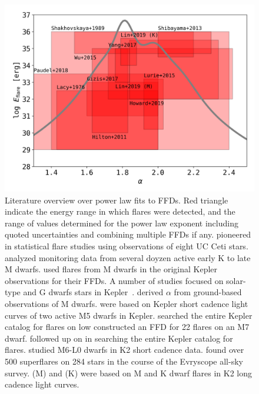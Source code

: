 \documentclass{aa}
\begin{document}
\begin{appendix}
   \begin{figure}
   \centering
            \includegraphics[width=\hsize]{pics/appendix/overview_alpha_literature.png}
         \caption{Literature overview over power law fits to FFDs. Red triangle indicate the energy range in which flares were detected, and the range of values determined for the power law exponent including quoted uncertainties and combining multiple FFDs if any. \citet{lacy_uv_1976} pioneered in statistical flare studies using observations of eight UC Ceti stars. \citet{shakhovskaya_stellar_1989} analyzed monitoring data from several doyzen active early K to late M dwarfs. \citet{hawley_kepler_2014} used flares from M dwarfs in the original Kepler observations for their FFDs. A number of studies focused on solar-type and G dwarfs stars in Kepler~\citep{maehara_superflares_2012,wu2015,shibayama_2013}. \citet{hilton2011} derived $\alpha$ from ground-based observations of M dwarfs. \citet{lurie_kepler_2015} were based on Kepler short cadence light curves of two active M5 dwarfs in Kepler. \citet{davenport_kepler_2016} searched the entire Kepler catalog for flares on low\citet{gizis_k2_2017-1} constructed an FFD for 22 flares on an M7 dwarf. \citet{yang_flaring_2017} followed up on \citet{davenport_kepler_2016} in searching the entire Kepler catalog for flares. \citet{paudel2018} studied M6-L0 dwarfs in K2 short cadence data. \citet{howard2019} found over 500 superflares on 284 stars in the course of the Evryscope all-sky survey. \citet{lin2019} (M) and (K) were based on M and K dwarf flares in K2 long cadence light curves. }
          \label{fig:powerlaw_literature}
     
   \end{figure}
\end{appendix}
\end{document}
